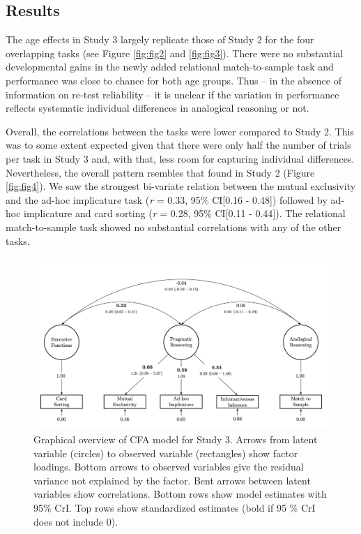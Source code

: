 \documentclass[
  man,floatsintext]{apa6}
\begin{document}
\hypertarget{results-2}{%
\subsection{Results}\label{results-2}}

The age effects in Study 3 largely replicate those of Study 2 for the four overlapping tasks (see Figure \ref{fig:fig2} and \ref{fig:fig3}). There were no substantial developmental gains in the newly added relational match-to-sample task and performance was close to chance for both age groups. Thus -- in the absence of information on re-test reliability -- it is unclear if the variation in performance reflects systematic individual differences in analogical reasoning or not.

Overall, the correlations between the tasks were lower compared to Study 2. This was to some extent expected given that there were only half the number of trials per task in Study 3 and, with that, less room for capturing individual differences. Nevertheless, the overall pattern rsembles that found in Study 2 (Figure \ref{fig:fig4}). We saw the strongest bi-variate relation between the mutual exclusivity and the ad-hoc implicature task (\emph{r} = 0.33, 95\% CI{[}0.16 - 0.48{]}) followed by ad-hoc implicature and card sorting (\emph{r} = 0.28, 95\% CI{[}0.11 - 0.44{]}). The relational match-to-sample task showed no substantial correlations with any of the other tasks.



\begin{figure}

{\centering \includegraphics[width=1\linewidth]{./figures/figure5} 

}

\caption{Graphical overview of CFA model for Study 3. Arrows from latent variable (circles) to observed variable (rectangles) show factor loadings. Bottom arrows to observed variables give the residual variance not explained by the factor. Bent arrows between latent variables show correlations. Bottom rows show model estimates with 95\% CrI. Top rows show standardized estimates (bold if 95 \% CrI does not include 0).}\label{fig:fig5}
\end{figure}
\end{document}
